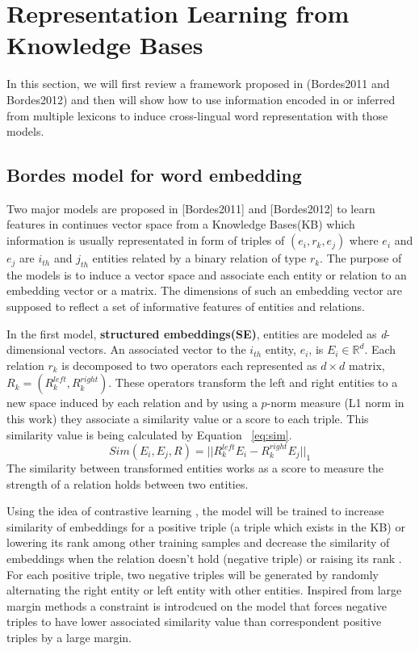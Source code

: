 \documentclass[11pt]{article}
\begin{document}
 

\section{Representation Learning from Knowledge Bases}

In this section, we will first review a framework proposed in (Bordes2011 and Bordes2012) and then will
 show how to use information encoded in or inferred from multiple lexicons to induce cross-lingual word representation 
with those models.


\subsection{Bordes model for word embedding}
\label{ssec:bordes}
Two major models are proposed in [Bordes2011] and [Bordes2012] to learn features in continues vector space
 from a Knowledge Bases(KB) which information is usually representated in form of triples of $(e_{i},r_{k} , e_{j} )$ 
 where $e_{i}$ and $e_{j}$ are $i_{th}$ and $j_{th}$ entities related
 by a binary relation of type $r_{k}$. The purpose of the models is to induce a vector space and associate
  each entity or relation to an embedding vector or a matrix.
  The dimensions of such an embedding vector are supposed to reflect a set of informative features of entities and relations.
   
   In the first model, \textbf{structured embeddings(SE)}, entities are modeled as \textit{d}-dimensional vectors.
    An associated vector to the $i_{th}$ entity, $e_{i}$, is $E_{i} \in \mathbb{R}^{d}$. Each relation $r_{k}$  
    is decomposed to two operators each represented as $d \times d$ matrix, $ R_k = (R_{k}^{left}, R_{k}^{right})$. 
    These operators transform the left and right entities to a new space induced by each relation and by using 
    a $p$-norm measure  (L1 norm in this work) they associate a similarity value or a score to each triple. 
    This similarity value is being calculated by
    Equation ~\eqref{eq:sim}. 
    \begin{equation}
    \label{eq:sim}Sim(E_{i}, E_{j}, R) = ||R_{k}^{left}E_{i} - R_{k}^{right}E_{j} ||_{1}
    \end{equation}
    The similarity between transformed entities works as a score to measure the strength of a relation holds between two entities. 
      
    Using the idea of contrastive learning , the model will be trained to increase similarity of 
    embeddings for a positive triple (a triple which exists in the KB) or lowering its rank among other training samples
    and decrease the similarity of embeddings when the relation doesn't hold (negative triple) or raising its rank . 
    For each positive triple, two negative triples will be generated by randomly alternating the right entity or left entity with other entities.
    Inspired from large margin methods a constraint is introdcued on the model that forces 
    negative triples to have lower associated similarity value  than correspondent positive triples by a large margin.
    
\end{document}
